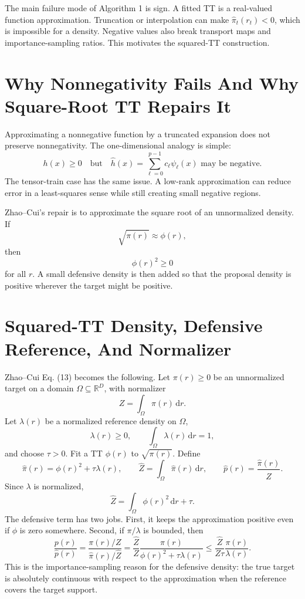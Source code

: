 \documentclass[11pt]{article}
\newcommand{\R}{\mathbb R}
\newcommand{\dd}{\,\mathrm d}
\begin{document}
The main failure mode of Algorithm 1 is sign.  A fitted TT is a real-valued
function approximation.  Truncation or interpolation can make
\(\widehat\pi_t(r_t)<0\), which is impossible for a density.  Negative values
also break transport maps and importance-sampling ratios.  This motivates the
squared-TT construction.

\section{Why Nonnegativity Fails And Why Square-Root TT Repairs It}

Approximating a nonnegative function by a truncated expansion does not preserve
nonnegativity.  The one-dimensional analogy is simple:
\[
    h(x)\ge 0
    \quad\text{but}\quad
    \widehat h(x)=\sum_{\ell=0}^{p-1}c_\ell\psi_\ell(x)
    \text{ may be negative.}
\]
The tensor-train case has the same issue.  A low-rank approximation can reduce
error in a least-squares sense while still creating small negative regions.

Zhao--Cui's repair is to approximate the square root of an unnormalized density.
If
\[
    \sqrt{\pi(r)}\approx \phi(r),
\]
then
\[
    \phi(r)^2\ge 0
\]
for all \(r\).  A small defensive density is then added so that the proposal
density is positive wherever the target might be positive.

\section{Squared-TT Density, Defensive Reference, And Normalizer}

Zhao--Cui Eq. (13) becomes the following.  Let \(\pi(r)\ge0\) be an
unnormalized target on a domain \(\Omega\subseteq\R^D\), with normalizer
\[
    Z=\int_\Omega \pi(r)\dd r.
\]
Let \(\lambda(r)\) be a normalized reference density on \(\Omega\),
\[
    \lambda(r)\ge0,\qquad \int_\Omega \lambda(r)\dd r=1,
\]
and choose \(\tau>0\).  Fit a TT \(\phi(r)\) to \(\sqrt{\pi(r)}\).  Define
\[
    \widehat\pi(r)
    =
    \phi(r)^2+\tau\lambda(r),
    \qquad
    \widehat Z
    =
    \int_\Omega \widehat\pi(r)\dd r,
    \qquad
    \widehat p(r)
    =
    \frac{\widehat\pi(r)}{\widehat Z}.
    \tag{S1}
\]
Since \(\lambda\) is normalized,
\[
    \widehat Z
    =
    \int_\Omega \phi(r)^2\dd r+\tau.
    \tag{S2}
\]
The defensive term has two jobs.  First, it keeps the approximation positive
even if \(\phi\) is zero somewhere.  Second, if \(\pi/\lambda\) is bounded, then
\[
    \frac{p(r)}{\widehat p(r)}
    =
    \frac{\pi(r)/Z}{\widehat\pi(r)/\widehat Z}
    =
    \frac{\widehat Z}{Z}
    \frac{\pi(r)}{\phi(r)^2+\tau\lambda(r)}
    \le
    \frac{\widehat Z}{Z\tau}
    \frac{\pi(r)}{\lambda(r)}.
    \tag{S3}
\]
This is the importance-sampling reason for the defensive density: the true
target is absolutely continuous with respect to the approximation when the
reference covers the target support.
\end{document}
